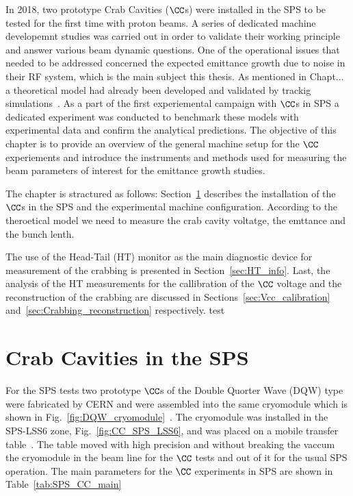 
\vspace*{1mm}
In 2018, two prototype Crab Cavities ($\CC$s) were installed in the SPS to be tested for the first time with proton beams. A series of dedicated machine developemnt studies was carried out in order to validate their working principle and answer various beam dynamic questions. One of the operational issues that needed to be addressed concerned the expected emittance growth due to noise in their RF system, which is the main subject this thesis. As mentioned in Chapt... a theoretical model had already been developed and validated by trackig simulations~\cite{PhysRevSTAB.18.101001}. As a part of the first experiemental campaign with $\CC$s in SPS a dedicated experiment was conducted to benchmark these models with experimental data and confirm the analytical predictions. The objective of this chapter is to provide an overview of the general machine setup for the $\CC$ experiements and introduce the instruments and methods used for measuring the beam parameters of interest for the emittance growth studies.


The chapter is stractured as follows: Section~\ref{sec:CC_SPS_setup} describes the installation of the $\CC$s in the SPS and the experimental machine configuration. According to the theroetical model we need to measure the crab cavity voltatge, the emttance and the bunch lenth.


The use of the Head-Tail (HT) monitor as the main diagnostic device for measurement of the crabbing is presented in Section~\ref{sec:HT_info}. Last, the analysis of the HT measurements for the callibration of the $\CC$ voltage and the reconstruction of the crabbing are discussed in Sections~\ref{sec:Vcc_calibration} and~\ref{sec:Crabbing_reconstruction} respectively. test

\section{Crab Cavities in the SPS}\label{sec:CC_SPS_setup}

For the SPS tests two prototype $\CC$s of the Double Quorter Wave (DQW) type were fabricated by CERN and were assembled into the same cryomodule which is shown in Fig.~\ref{fig:DQW_cryomodule}~\cite{Zanoni:2017}. The cryomodule was installed in the SPS-LSS6 zone, Fig.~\ref{fig:CC_SPS_LSS6}, and was placed on a mobile transfer table~\cite{Calaga:2649807}. The table moved with high precision and without breaking the vaccum the cryomodule in the beam line for the $\CC$ tests and out of it for the usual SPS operation. The main parameters for the $\CC$ experiments in SPS are shown in Table~\ref{tab:SPS_CC_main}


